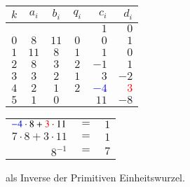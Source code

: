 \begin{center}

\begin{tabular}{| c | c c | c | r r |}
	\hline
	$k$ & $a_i$ & $b_i$ & $q_i$ & $c_i$ & $d_i$\\
	\hline 
	& & & & $1$& $0$\\
	$0$& $8$& $11$& $0$& $0$& $1$\\
	$1$& $11$& $8$& $1$& $1$& $0$\\
	$2$& $8$& $3$& $2$& $-1$& $1$\\
	$3$& $3$& $2$& $1$& $3$& $-2$\\
	$4$& $2$& $1$& $2$& \textcolor{blue}{$-4$}& \textcolor{red}{$3$}\\
	$5$& $1$& $0$& & $11$& $-8$\\
	\hline
\end{tabular}

\end{center}
\begin{center}

\begin{tabular}{rcl}
	$\textcolor{blue}{-4} \cdot 8 + \textcolor{red}{3} \cdot 11$ &$=$& $1$\\
	$7 \cdot 8 + 3 \cdot 11$ &$=$& $1$\\
	$8^{-1}$ &$=$& $7$
	
\end{tabular}

\end{center}

als Inverse der Primitiven Einheitswurzel.

